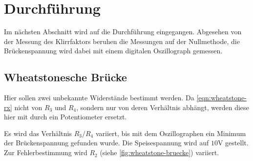 \section{Durchführung}
\label{sec:Durchführung}
Im nächsten Abschnitt wird auf die Durchführung eingegangen. Abgesehen von der Messung des
Klirrfaktors beruhen die Messungen auf der 
Nullmethode, die Brückenspannung wird dabei mit einem digitalen Oszillograph gemessen.

\subsection{Wheatstonesche Brücke}
\label{sec:ExecWheatstonescheBrücke}

Hier sollen zwei unbekannte Widerstände bestimmt werden. Da \autoref{eqn:wheatstone-rx} nicht von 
$R_3$ und $R_4$, sondern nur von deren Verhältnis abhängt,
werden diese hier mit durch ein Potentiometer ersetzt.

Es wird das Verhältnis $R_3/R_4$ variiert, bis mit dem Oszillographen ein Minimum der Brückenspannung
gefunden wurde. Die Speisespannung wird auf $10\si{\volt}$ gestellt. Zur Fehlerbestimmung wird $R_2$
(siehe \autoref{fig:wheatstone-bruecke}) variiert.
